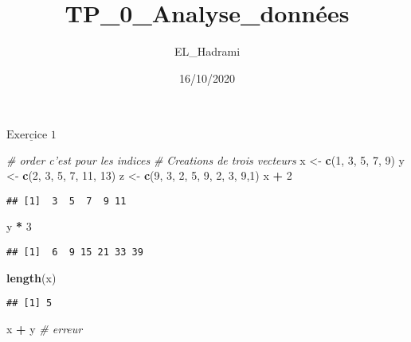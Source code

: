 \documentclass[]{article}
\title{TP\_0\_Analyse\_données}
\author{EL\_Hadrami}
\date{16/10/2020}
\newenvironment{Shaded}{\begin{snugshade}}{\end{snugshade}}
\newcommand{\CommentTok}[1]{\textcolor[rgb]{0.56,0.35,0.01}{\textit{#1}}}
\newcommand{\DecValTok}[1]{\textcolor[rgb]{0.00,0.00,0.81}{#1}}
\newcommand{\KeywordTok}[1]{\textcolor[rgb]{0.13,0.29,0.53}{\textbf{#1}}}
\newcommand{\NormalTok}[1]{#1}
\newcommand{\OperatorTok}[1]{\textcolor[rgb]{0.81,0.36,0.00}{\textbf{#1}}}
\newcommand{\StringTok}[1]{\textcolor[rgb]{0.31,0.60,0.02}{#1}}
\begin{document}
\maketitle

\(\underline{\text{Exercice 1}}\)

\begin{Shaded}
\begin{Highlighting}[]
\CommentTok{# order c'est pour les indices}
\CommentTok{# Creations de trois vecteurs}
\NormalTok{x <-}\StringTok{ }\KeywordTok{c}\NormalTok{(}\DecValTok{1}\NormalTok{, }\DecValTok{3}\NormalTok{, }\DecValTok{5}\NormalTok{, }\DecValTok{7}\NormalTok{, }\DecValTok{9}\NormalTok{)}
\NormalTok{y <-}\StringTok{ }\KeywordTok{c}\NormalTok{(}\DecValTok{2}\NormalTok{, }\DecValTok{3}\NormalTok{, }\DecValTok{5}\NormalTok{, }\DecValTok{7}\NormalTok{, }\DecValTok{11}\NormalTok{, }\DecValTok{13}\NormalTok{) }
\NormalTok{z <-}\StringTok{ }\KeywordTok{c}\NormalTok{(}\DecValTok{9}\NormalTok{, }\DecValTok{3}\NormalTok{, }\DecValTok{2}\NormalTok{, }\DecValTok{5}\NormalTok{, }\DecValTok{9}\NormalTok{, }\DecValTok{2}\NormalTok{, }\DecValTok{3}\NormalTok{, }\DecValTok{9}\NormalTok{,}\DecValTok{1}\NormalTok{)}
\NormalTok{x }\OperatorTok{+}\StringTok{ }\DecValTok{2} 
\end{Highlighting}
\end{Shaded}

\begin{verbatim}
## [1]  3  5  7  9 11
\end{verbatim}

\begin{Shaded}
\begin{Highlighting}[]
\NormalTok{y }\OperatorTok{*}\StringTok{ }\DecValTok{3} 
\end{Highlighting}
\end{Shaded}

\begin{verbatim}
## [1]  6  9 15 21 33 39
\end{verbatim}

\begin{Shaded}
\begin{Highlighting}[]
\KeywordTok{length}\NormalTok{(x) }
\end{Highlighting}
\end{Shaded}

\begin{verbatim}
## [1] 5
\end{verbatim}

\begin{Shaded}
\begin{Highlighting}[]
\NormalTok{x }\OperatorTok{+}\StringTok{ }\NormalTok{y  }\CommentTok{# erreur}
\end{Highlighting}
\end{Shaded}
\end{document}
